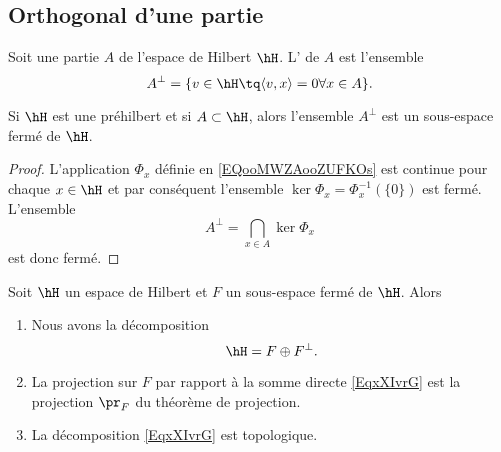 \subsection{Orthogonal d'une partie}

\begin{definition}  \label{DEFooXUXQooMmDnhW}
	Soit une partie \( A\) de l'espace de Hilbert \( \hH\). L' de \( A\) est l'ensemble
	\begin{equation}
		A^{\perp}=\{ v\in\hH\tq \langle v, x\rangle =0\forall x\in A \}.
	\end{equation}
\end{definition}

\begin{proposition}     \label{PropdpaMpH}
	Si \( \hH\) est une préhilbert et si \( A\subset \hH\), alors l'ensemble \( A^{\perp}\) est un sous-espace fermé de \( \hH\).
\end{proposition}

\begin{proof}
	L'application \( \Phi_x\) définie en \eqref{EQooMWZAooZUFKOs} est continue pour chaque \( x\in\hH\) et par conséquent l'ensemble \( \ker\Phi_x=\Phi_x^{-1}(\{ 0 \})\) est fermé. L'ensemble
	\begin{equation}
		A^{\perp}=\bigcap_{x\in A}\ker\Phi_x
	\end{equation}
	est donc fermé.
\end{proof}

\begin{theorem}     \label{ThowZyaiz}
	Soit \( \hH\) un espace de Hilbert et \( F\) un sous-espace fermé de \( \hH\). Alors
	\begin{enumerate}
		\item
		      Nous avons la décomposition
		      \begin{equation}        \label{EqxXIvrG}
			      \hH=F\oplus F^{\perp}.
		      \end{equation}
		\item       \label{ItemThowZyaizii}
		      La projection sur \( F\) par rapport à la somme directe \eqref{EqxXIvrG} est la projection \( \pr_F\) du théorème de projection.
		\item
		      La décomposition \eqref{EqxXIvrG} est topologique.
	\end{enumerate}
\end{theorem}

